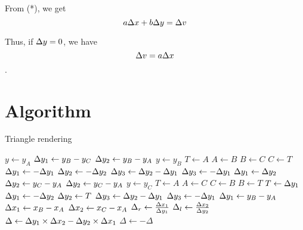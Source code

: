 From (*), we get
$$a \Delta x + b \Delta y = \Delta v$$

Thus, if $\Delta y = 0$, we have $$\Delta v = a \Delta x$$.

\section{Algorithm}

\begin{algorithm}
  \caption{Triangle rendering}
  \begin{algorithmic}[1]
    \State $y \gets y_A$ 
    \State $\Delta y_1 \gets y_B - y_C$
    \State $\Delta y_2 \gets y_B - y_A$
    \State $y \gets y_B$
    \State $T \gets A$
    \State $A \gets B$
    \State $B \gets C$
    \State $C \gets T$
    \State $\Delta y_1 \gets - \Delta y_1$
    \State $\Delta y_2 \gets - \Delta y_2$
    \State $\Delta y_3 \gets \Delta y_2 - \Delta y_1$
    \Else
    \State $\Delta y_3 \gets - \Delta y_1$
    \State $\Delta y_1 \gets \Delta y_2$
    \State $\Delta y_2 \gets y_C - y_A$
    \EndIf
    \Else
    \State $\Delta y_2 \gets y_C - y_A$
    \State $y \gets y_C$
    \State $T \gets A$
    \State $A \gets C$
    \State $C \gets B$
    \State $B \gets T$
    \State $T \gets \Delta y_1$
    \State $\Delta y_1 \gets - \Delta y_2$
    \State $\Delta y_2 \gets T$
    \State $\Delta y_3 \gets \Delta y_2 - \Delta y_1$
    \Else
    \State $\Delta y_3 \gets - \Delta y_1$
    \State $\Delta y_1 \gets y_B - y_A$
    \EndIf
    \EndIf
    \State $\Delta x_1 \gets x_B - x_A$ 
    \State $\Delta x_2 \gets x_C - x_A$ 
    \State $\Delta_{r} \gets \frac{\Delta x_1}{\Delta y_1}$ 
    \EndIf
    \State $\Delta_{l} \gets \frac{\Delta x_2}{\Delta y_2}$ 
    \EndIf
    \State $\Delta \gets \Delta y_1 \times \Delta x_2 - \Delta y_2 \times \Delta x_1$
    \Return {}
    \Else
    \State $\Delta \gets - \Delta$
    \EndIf
    \EndProcedure
  \end{algorithmic}
\end{algorithm}

